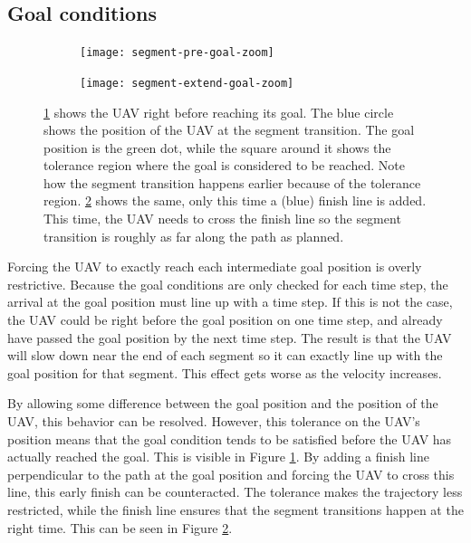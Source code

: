 \subsection{Goal conditions}
\label{subsec:goal-cond}

\begin{figure}
	\centering
	\begin{subfigure}[t]{0.45\columnwidth}
        		\texttt{[image: segment-pre-goal-zoom]}
        		\caption{}
        		 \label{fig:goal-ext-pre}
	\end{subfigure}	
		\hfil
	\begin{subfigure}[t]{0.45\columnwidth}
        		\texttt{[image: segment-extend-goal-zoom]}
        		\caption{}
        		\label{fig:goal-ext-post}
	\end{subfigure}
    \caption[A visualization of the extended goal conditions]{\ref{fig:goal-ext-pre} shows the UAV right before reaching its goal. The blue circle shows the position of the UAV at the segment transition. The goal position is the green dot, while the square around it shows the tolerance region where the goal is considered to be reached. Note how the segment transition happens earlier because of the tolerance region. \ref{fig:goal-ext-post} shows the same, only this time a (blue) finish line is added. This time, the UAV needs to cross the finish line so the segment transition is roughly as far along the path as planned.}
    \label{fig:goal-ext}     
\end{figure}
Forcing the UAV to exactly reach each intermediate goal position is overly restrictive. Because the goal conditions are only checked for each time step, the arrival at the goal position must line up with a time step. If this is not the case, the UAV could be right before the goal position on one time step, and already have passed the goal position by the next time step. The result is that the UAV will slow down near the end of each segment so it can exactly line up with the goal position for that segment. This effect gets worse as the velocity increases.
\par
By allowing some difference between the goal position and the position of the UAV, this behavior can be resolved. However, this tolerance on the UAV's position means that the goal condition tends to be satisfied before the UAV has actually reached the goal. This is visible in Figure \ref{fig:goal-ext-pre}. By adding a finish line perpendicular to the path at the goal position and forcing the UAV to cross this line, this early finish can be counteracted. The tolerance makes the trajectory less restricted, while the finish line ensures that the segment transitions happen at the right time. This can be seen in Figure \ref{fig:goal-ext-post}.
\newpage
